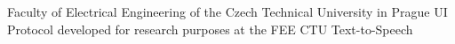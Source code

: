  Faculty of Electrical Engineering of the Czech Technical University in Prague
\abbrv[UIP]  UI Protocol developed for research purposes at the FEE CTU
\abbrv[TTS]  Text-to-Speech

\stopAbbreviations

\endinput
